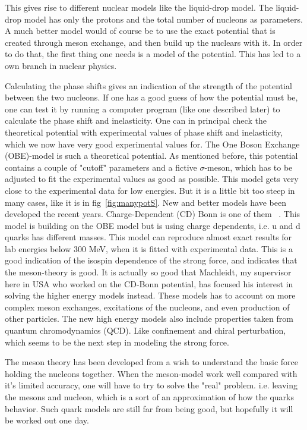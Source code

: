 This gives rise to different nuclear models like the liquid-drop model. 
The liquid-drop model has only the protons and the total number of nucleons as parameters.
A much better model would of course be to use the exact potential that is created through meson exchange,
and then build up the nuclears with it.
In order to do that, the first thing one needs is a model of the potential. This has led to a own branch in
nuclear physics.

Calculating the phase shifts gives an indication of the strength of the potential between the two nucleons.
If one has a good guess of how the potential must be, one can test it by running a computer program 
(like one described later) to calculate the phase shift and inelasticity. 
One can in principal check the theoretical potential with experimental values of phase shift and inelasticity,
which we now have very good experimental values for.
The One Boson Exchange (OBE)-model is such a theoretical potential.
As mentioned before, this potential contains a couple of "cutoff" parameters and a fictive $\sigma$-meson, 
which has to be adjusted to fit the experimental values as good as possible. This model gets very close to
the experimental data for low energies. But it is a little bit too steep in many cases, like it is in 
fig~\ref{fig:manypotS}. New and better models have been developed the recent years.
Charge-Dependent (CD) Bonn is one of them ~\cite{cd-bonn}. 
This model is building on the OBE model but is using charge dependents, i.e. u and d quarks has different masses.
This model can reproduce almost exact results for lab energies below 300 MeV, 
when it is fitted with experimental data. This is a good indication of the isospin dependence of the strong force,
and indicates that the meson-theory is good. It is actually so good that Machleidt, my supervisor here in USA 
who worked on the CD-Bonn potential, has focused his interest in solving the higher energy models instead. 
These models has to account on more complex meson exchanges, excitations of the nucleons, 
and even production of other particles.
The new high energy models also include properties taken from quantum chromodynamics (QCD).
Like confinement and chiral perturbation, which seems to be the next step in modeling the strong force.

The meson theory has been developed from a wish to understand the basic force holding the nucleons together. 
When the meson-model work well compared with it's limited accuracy, one will have to try to solve the "real" problem. 
i.e. leaving the mesons and nucleon, which is a sort of an approximation of how the quarks behavior.
Such quark models are still far from being good, but hopefully it will be worked out one day. 

